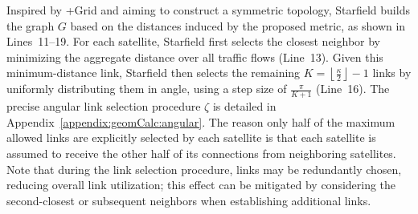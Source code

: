 \documentclass[acmsmall, screen]{acmart}
\begin{document}
Inspired by +Grid and aiming to construct a symmetric topology, Starfield builds the graph $G$ based on the distances induced by the proposed metric, as shown in Lines~11–19. For each satellite, Starfield first selects the closest neighbor by minimizing the aggregate distance over all traffic flows (Line~13). Given this minimum-distance link, Starfield then selects the remaining $K = \left\lfloor\frac{\kappa}{2}\right\rfloor - 1$ links by uniformly distributing them in angle, using a step size of $\frac{\pi}{K+1}$ (Line~16). The precise angular link selection procedure $\zeta$ is detailed in Appendix~\ref{appendix:geomCalc:angular}. The reason only half of the maximum allowed links are explicitly selected by each satellite is that each satellite is assumed to receive the other half of its connections from neighboring satellites. Note that during the link selection procedure, links may be redundantly chosen, reducing overall link utilization; this effect can be mitigated by considering the second-closest or subsequent neighbors when establishing additional links.
\end{document}
